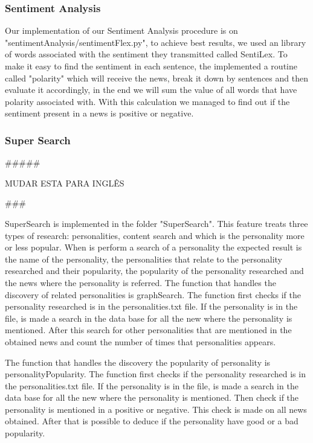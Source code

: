 \documentclass{acm_proc_article-sp}
\begin{document}
\subsubsection{Sentiment Analysis}

Our implementation of our Sentiment Analysis procedure is on "sentimentAnalysis/sentimentFlex.py", to achieve best results, we used an library of words associated with the sentiment they transmitted called SentiLex\cite{sent}. 
To make it easy to find the sentiment in each sentence, the implemented a routine called "polarity" which will receive the news, break it down by sentences and then evaluate it accordingly, in the end we will sum the value of all words that have polarity associated with. With this calculation we managed to find out if the sentiment present in a news is positive or negative.

\subsubsection{Super Search}


#####

MUDAR ESTA PARA INGLÊS

###


SuperSearch is implemented in the folder "SuperSearch". This feature treats three types of research: personalities, content search and which is the personality more or less popular. 
When is perform a search of a personality the expected result is the name of the personality, the personalities that relate to the personality researched and their popularity, the popularity of the personality researched and the news where the personality is referred.
The function that handles the discovery of related personalities is graphSearch. The function first checks if the personality researched is in the personalities.txt file. If the personality is in the file, is made a search in the data base for all the new where the personality is mentioned. After this search for other personalities that are mentioned in the obtained news and count the number of times that personalities appears.

The function that handles the discovery the popularity of personality is personalityPopularity. The function first checks if the personality researched is in the personalities.txt file. If the personality is in the file, is made a search in the data base for all the new where the personality is mentioned. Then check if the personality is mentioned in a positive or negative. This check is made on all news obtained. After that is possible to deduce if the personality have good or a bad popularity.
\end{document}

